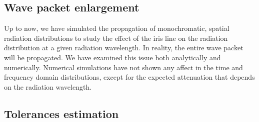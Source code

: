 \subsection{Wave packet enlargement}

    Up to now, we have simulated the propagation of monochromatic, spatial radiation distributions to study the effect of the iris line on the radiation distribution at a given radiation wavelength. In reality, the entire wave packet will be propagated. We have examined this issue both analytically and numerically. Numerical simulations have not shown any affect in the time and frequency domain distributions, except for the expected attenuation that depends on the radiation wavelength.
    
\subsection{Tolerances estimation}

